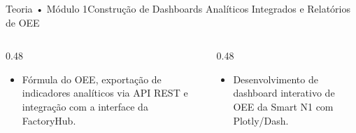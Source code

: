 \begin{senaiframe}{Teoria • Módulo 1}{Construção de Dashboards Analíticos Integrados e Relatórios de OEE}
  \begin{columns}[t]
    \begin{column}{0.48\textwidth}
      \begin{tcolorbox}[senaibluecard, title={Fundamentos Teóricos}]
        \begin{itemize}
          \item Fórmula do OEE, exportação de indicadores analíticos via API REST e integração com a interface da FactoryHub.
        \end{itemize}
      \end{tcolorbox}
    \end{column}
    \begin{column}{0.48\textwidth}
      \begin{tcolorbox}[senaigreencard, title={Prática \& Laboratório}]
        \begin{itemize}
          \item Desenvolvimento de dashboard interativo de OEE da Smart N1 com Plotly/Dash.
        \end{itemize}
      \end{tcolorbox}
    \end{column}
  \end{columns}
\end{senaiframe}
